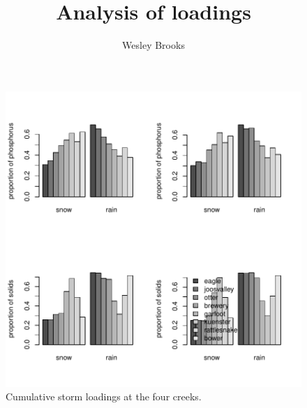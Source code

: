 \documentclass[10pt]{article}
\title{Analysis of loadings}
\author{Wesley Brooks}
\date{}                                           %
\begin{document}
\maketitle


















\begin{figure}[h!]
    \begin{center}
\includegraphics{loadings-fig2}
    \end{center}
    \vspace{-10mm}
    \caption{Cumulative storm loadings at the four creeks.\label{bars}}
\end{figure}
\end{document}
